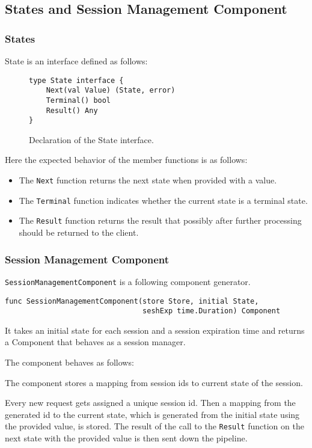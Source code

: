 \documentclass[12pt,a4paper]{article}
\begin{document}
\subsection{States and Session Management Component}
\subsubsection{States}
State is an interface defined as follows:

\begin{figure}[h]
\centering
\begin{lstlisting}
type State interface {
    Next(val Value) (State, error)
    Terminal() bool
    Result() Any
}
\end{lstlisting}
\caption[scale=1.0]{Declaration of the State interface.}
\label{fig:State}
\end{figure}

Here the expected behavior of the member functions is as follows:
\begin{itemize}
	\item The \texttt{Next} function returns the next state when provided with a value.
	\item The \texttt{Terminal} function indicates whether the current state is a terminal state.
	\item The \texttt{Result} function returns the result that possibly after further 
		  processing should be returned to the client.
\end{itemize}

\subsubsection{Session Management Component}
\texttt{SessionManagementComponent} is a following component generator.
\begin{lstlisting}
func SessionManagementComponent(store Store, initial State, 
                                seshExp time.Duration) Component
\end{lstlisting}

It takes an initial state for each session and a session expiration time and 
returns a Component that behaves as a session manager. 

The component behaves as follows:

The component stores a mapping from session ids to current state of the session.

Every new request gets assigned a unique session id. Then a mapping from the generated 
id to the current state, which is generated from the initial state using the provided value,
is stored. The result of the call to the \texttt{Result} function on the next state with the provided 
value is then sent down the pipeline.
\end{document}
